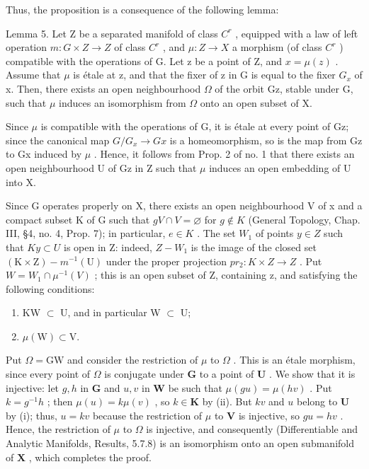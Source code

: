 Thus, the proposition is a consequence of the following lemma:

Lemma 5. Let Z be a separated manifold of class \(C^{r}\) , equipped with a law of left operation \(m: G \times Z \to Z\) of class \(C^{r}\) , and \(\mu: Z \to X\) a morphism (of class \(C^{r}\) ) compatible with the operations of G. Let z be a point of Z, and \(x = \mu(z)\) . Assume that \(\mu\) is étale at z, and that the fixer of z in G is equal to the fixer \(G_{x}\) of x. Then, there exists an open neighbourhood \(\Omega\) of the orbit Gz, stable under G, such that \(\mu\) induces an isomorphism from \(\Omega\) onto an open subset of X.

Since \(\mu\) is compatible with the operations of G, it is étale at every point of Gz; since the canonical map \(G/G_{x} \rightarrow Gx\) is a homeomorphism, so is the map from Gz to Gx induced by \(\mu\) . Hence, it follows from Prop. 2 of no. 1 that there exists an open neighbourhood U of Gz in Z such that \(\mu\) induces an open embedding of U into X.

Since G operates properly on X, there exists an open neighbourhood V of x and a compact subset K of G such that \(gV \cap V = \varnothing\) for \(g \notin K\) (General Topology, Chap. III, §4, no. 4, Prop. 7); in particular, \(e \in K\) . The set \(W_{1}\) of points \(y \in Z\) such that \(Ky \subset U\) is open in Z: indeed, \(Z - W_{1}\) is the image of the closed set \((\mathrm{K} \times \mathrm{Z}) - m^{-1}(\mathrm{U})\) under the proper projection \(pr_{2}: K \times Z \to Z\) . Put \(W = W_{1} \cap \mu^{-1}(V)\) ; this is an open subset of Z, containing z, and satisfying the following conditions:

\begin{enumerate}
\def\labelenumi{(\roman{enumi})}
\item
  KW \(\subset\) U, and in particular W \(\subset\) U;
\item
  \(\mu(\mathrm{W}) \subset \mathrm{V}.\)
\end{enumerate}

Put \(\Omega = \mathrm{GW}\) and consider the restriction of \(\mu\) to \(\Omega\) . This is an étale morphism, since every point of \(\Omega\) is conjugate under \(\mathbf{G}\) to a point of \(\mathbf{U}\) . We show that it is injective: let \(g, h\) in \(\mathbf{G}\) and \(u, v\) in \(\mathbf{W}\) be such that \(\mu(gu) = \mu(hv)\) . Put \(k = g^{-1}h\) ; then \(\mu(u) = k\mu(v)\) , so \(k \in \mathbf{K}\) by (ii). But \(kv\) and \(u\) belong to \(\mathbf{U}\) by (i); thus, \(u = kv\) because the restriction of \(\mu\) to \(\mathbf{V}\) is injective, so \(gu = hv\) . Hence, the restriction of \(\mu\) to \(\Omega\) is injective, and consequently (Differentiable and Analytic Manifolds, Results, 5.7.8) is an isomorphism onto an open submanifold of \(\mathbf{X}\) , which completes the proof.

